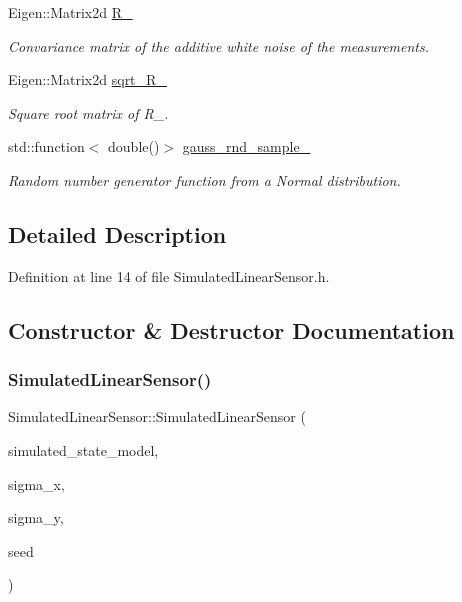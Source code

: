 \begin{DoxyCompactItemize}
Eigen\+::\+Matrix2d \mbox{\hyperlink{classbfl_1_1LinearModel_afafae44b71487e16b19311f773a19db8}{R\+\_\+}}
\begin{DoxyCompactList}\small\item\em Convariance matrix of the additive white noise of the measurements. \end{DoxyCompactList}\item 
Eigen\+::\+Matrix2d \mbox{\hyperlink{classbfl_1_1LinearModel_abfb1e70c848b8c3406551b13b4926701}{sqrt\+\_\+\+R\+\_\+}}
\begin{DoxyCompactList}\small\item\em Square root matrix of R\+\_\+. \end{DoxyCompactList}\item 
std\+::function$<$ double()$>$ \mbox{\hyperlink{classbfl_1_1LinearModel_aa58a166ce01d56574fe0b3f4d41dea19}{gauss\+\_\+rnd\+\_\+sample\+\_\+}}
\begin{DoxyCompactList}\small\item\em Random number generator function from a Normal distribution. \end{DoxyCompactList}\end{DoxyCompactItemize}


\subsection{Detailed Description}


Definition at line 14 of file Simulated\+Linear\+Sensor.\+h.



\subsection{Constructor \& Destructor Documentation}
\mbox{\label{classbfl_1_1SimulatedLinearSensor_a8635098b474ee1a6601a857a3700728a}} 
\subsubsection{\texorpdfstring{Simulated\+Linear\+Sensor()}{SimulatedLinearSensor()}\hspace{0.1cm}{\footnotesize\ttfamily [1/3]}}
{\footnotesize\ttfamily Simulated\+Linear\+Sensor\+::\+Simulated\+Linear\+Sensor (\begin{DoxyParamCaption}\item[{std\+::unique\+\_\+ptr$<$ \mbox{\hyperlink{classbfl_1_1SimulatedStateModel}{bfl\+::\+Simulated\+State\+Model}} $>$}]{simulated\+\_\+state\+\_\+model,  }\item[{const double}]{sigma\+\_\+x,  }\item[{const double}]{sigma\+\_\+y,  }\item[{const unsigned int}]{seed }\end{DoxyParamCaption})}



